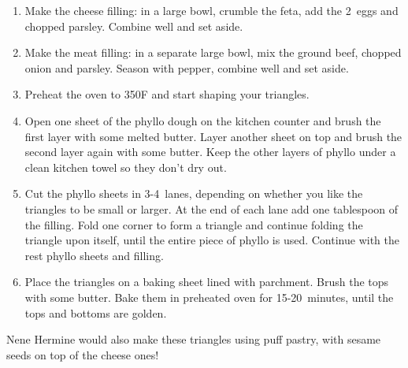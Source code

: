 \begin{enumerate}
    \item Make the cheese filling: in a large bowl, crumble the feta, add the 2~eggs and chopped parsley. Combine well and set aside.
    \item Make the meat filling: in a separate large bowl, mix the ground beef, chopped onion and parsley. Season with pepper, combine well and set aside.
    \item Preheat the oven to 350\degree F and start shaping your triangles.
    \item Open one sheet of the phyllo dough on the kitchen counter and brush the first layer with some melted butter. Layer another sheet on top and brush the second layer again with some butter. Keep the other layers of phyllo under a clean kitchen towel so they don't dry out.
    \item Cut the phyllo sheets in 3-4~lanes, depending on whether you like the triangles to be small or larger. At the end of each lane add one tablespoon of the filling. Fold one corner to form a triangle and continue folding the triangle upon itself, until the entire piece of phyllo is used. Continue with the rest phyllo sheets and filling.
    \item Place the triangles on a baking sheet lined with parchment. Brush the tops with some butter. Bake them in preheated oven for 15-20~minutes, until the tops and bottoms are golden.
\end{enumerate}

Nene Hermine would also make these triangles using puff pastry, with sesame seeds on top of the cheese ones!
